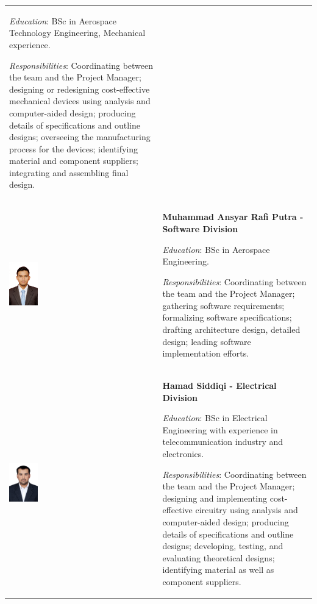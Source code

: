 \documentclass[a4paper,12pt,twoside]{article}
\begin{document}
\begin{longtable}[]{m{} m{}}
\smallskip
\textit{Education}: BSc in Aerospace Technology Engineering, Mechanical experience.

\smallskip
\textit{Responsibilities}: Coordinating between the team and the Project Manager; designing or redesigning cost-effective mechanical devices using analysis and computer-aided design; producing details of specifications and outline designs; overseeing the manufacturing process for the devices; identifying material and component suppliers; integrating and assembling final design.   \bigskip
\\

\includegraphics[width=0.2\textwidth]{1-introduction/img/muhammad-ansyar-rafi-putra.jpg} & \textbf{Muhammad Ansyar Rafi Putra - Software Division}

\smallskip
\textit{Education}: BSc in Aerospace Engineering.


\smallskip 
\textit{Responsibilities}: Coordinating between the team and the Project Manager; gathering software requirements; formalizing software specifications; drafting architecture design, detailed design; leading software implementation efforts.
\bigskip
\\

\includegraphics[width=0.2\textwidth]{1-introduction/img/hamad-saddiqi.jpg} & \textbf{Hamad Siddiqi - Electrical Division}

\smallskip
\textit{Education}: BSc in Electrical Engineering with experience in telecommunication industry and electronics.

\smallskip
\textit{Responsibilities}: Coordinating between the team and the Project Manager; designing and implementing cost-effective circuitry using analysis and computer-aided design; producing details of specifications and outline designs; developing, testing, and evaluating theoretical designs; identifying material as well as component suppliers. 
\bigskip
\\



\end{longtable}
\end{document}
